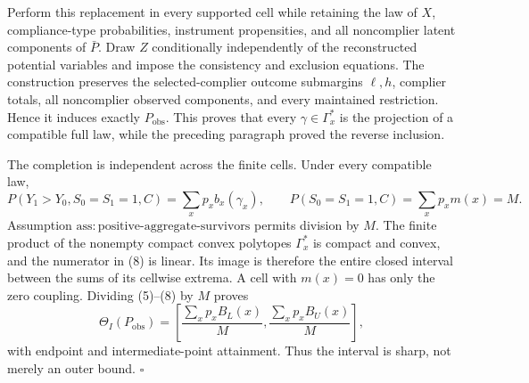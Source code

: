 Perform this replacement in every supported cell while retaining the
law of \(X\), compliance-type probabilities, instrument propensities,
and all noncomplier latent components of \(\bar P\).  Draw \(Z\)
conditionally independently of the reconstructed potential variables
and impose the consistency and exclusion equations.  The construction
preserves the selected-complier outcome submargins \(\ell,h\), complier
totals, all noncomplier observed components, and every maintained
restriction.  Hence it induces exactly \(P_{\mathrm{obs}}\).  This proves
that every \(\gamma\in\Gamma_x^{\ast}\) is the projection of a compatible
full law, while the preceding paragraph proved the reverse inclusion.

The completion is independent across the finite cells.  Under every
compatible law,
\[
P(Y_1>Y_0,S_0=S_1=1,C)=\sum_xp_xb_x(\gamma_x),
\qquad
P(S_0=S_1=1,C)=\sum_xp_xm(x)=M.
\tag{8}
\]
Assumption \(\mathrm{ass{:}positive\text{-}aggregate\text{-}survivors}\)
permits division by \(M\).  The finite product of the nonempty compact
convex polytopes \(\Gamma_x^{\ast}\) is compact and convex, and the
numerator in (8) is linear.  Its image is therefore the entire closed
interval between the sums of its cellwise extrema.  A cell with
\(m(x)=0\) has only the zero coupling.  Dividing (5)--(8) by \(M\) proves
\[
\Theta_I(P_{\mathrm{obs}})
=\left[\frac{\sum_xp_xB_L(x)}{M},
       \frac{\sum_xp_xB_U(x)}{M}\right],
\]
with endpoint and intermediate-point attainment.  Thus the interval is
sharp, not merely an outer bound. \(\square\)